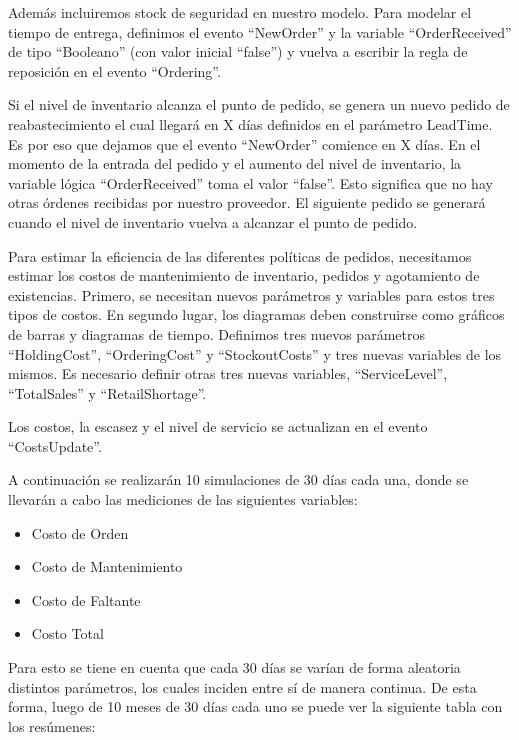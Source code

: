 Además incluiremos stock de seguridad en nuestro modelo.
Para modelar el tiempo de entrega, definimos el evento ``NewOrder'' y la variable ``OrderReceived'' de tipo ``Booleano'' (con valor inicial ``false'') y vuelva a escribir la regla de reposición en el evento ``Ordering''.

Si el nivel de inventario alcanza el punto de pedido, se genera un nuevo pedido de reabastecimiento el cual llegará en X días definidos en el parámetro LeadTime.
Es por eso que dejamos que el evento ``NewOrder'' comience en X días.
En el momento de la entrada del pedido y el aumento del nivel de inventario, la variable lógica ``OrderReceived'' toma el valor ``false''. Esto significa que no hay otras órdenes
recibidas por nuestro proveedor.
El siguiente pedido se generará cuando el nivel de inventario vuelva a alcanzar el punto de pedido.

Para estimar la eficiencia de las diferentes políticas de pedidos, necesitamos estimar los costos de mantenimiento de inventario, pedidos y agotamiento de existencias.
Primero, se necesitan nuevos parámetros y variables para estos tres tipos de costos. En segundo lugar, los diagramas deben construirse como gráficos de barras y diagramas de tiempo.
Definimos tres nuevos parámetros ``HoldingCost'', ``OrderingCost'' y ``StockoutCosts'' y tres nuevas variables de los mismos. Es necesario definir otras tres nuevas variables, ``ServiceLevel'', ``TotalSales'' y ``RetailShortage''.

Los costos, la escasez y el nivel de servicio se actualizan en el evento ``CostsUpdate''.

A continuación se realizarán 10 simulaciones de 30 días cada una, donde se llevarán a cabo las mediciones de las siguientes variables:
\begin{itemize}
    \item Costo de Orden
    \item Costo de Mantenimiento
    \item Costo de Faltante
    \item Costo Total
\end{itemize}

Para esto se tiene en cuenta que cada 30 días se varían de forma aleatoria distintos parámetros, los cuales inciden entre sí de manera continua. De esta forma, luego de 10 meses de 30 días cada uno se puede ver la siguiente tabla con los resúmenes:

